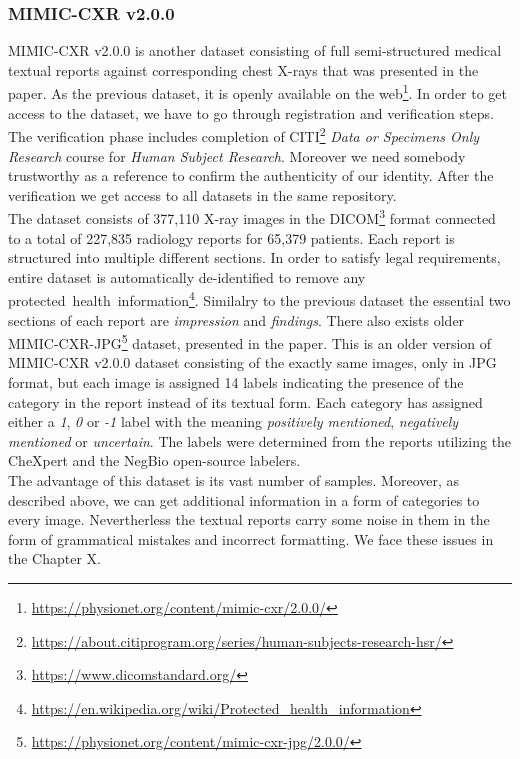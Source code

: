 \subsubsection{MIMIC-CXR v2.0.0}
MIMIC-CXR v2.0.0 is another dataset consisting of full semi-structured medical textual reports against corresponding chest X-rays that was presented in the \citet{cxr:johnson2019mimic} paper. As the previous dataset, it is openly available on the web\footnote[1]{\url{https://physionet.org/content/mimic-cxr/2.0.0/}}. In order to get access to the dataset, we have to go through registration and verification steps. The verification phase includes completion of CITI\footnote[1]{\url{https://about.citiprogram.org/series/human-subjects-research-hsr/}} \textit{Data or Specimens Only Research} course for \textit{Human Subject Research}. Moreover we need somebody trustworthy as a reference to confirm the authenticity of our identity. After the verification we get access to all datasets in the same repository.\\

The dataset consists of 377,110 X-ray images in the DICOM\footnote[1]{\url{https://www.dicomstandard.org/}} format connected to a total of 227,835 radiology reports for 65,379 patients. Each report is structured into multiple different sections. In order to satisfy legal requirements, entire dataset is automatically de-identified to remove any protected~health~information\footnote[1]{\url{https://en.wikipedia.org/wiki/Protected\_health\_information}}. Similalry to the previous dataset the essential two sections of each report are \textit{impression} and \textit{findings}. There also exists older MIMIC-CXR-JPG\footnote[1]{\url{https://physionet.org/content/mimic-cxr-jpg/2.0.0/}} dataset, presented in the \citet{cxr-jpg:johnson2019mimic} paper. This is an older version of MIMIC-CXR v2.0.0 dataset consisting of the exactly same images, only in JPG format, but each image is assigned 14 labels indicating the presence of the category in the report instead of its textual form. Each category has assigned either a \textit{1}, \textit{0} or \textit{-1} label with the meaning \textit{positively mentioned}, \textit{negatively mentioned} or \textit{uncertain}. The labels were determined from the reports utilizing the CheXpert\citep{irvin2019chexpert} and the NegBio\citep{peng2018negbio} open-source labelers.\\

The advantage of this dataset is its vast number of samples. Moreover, as described above, we can get additional information in a form of categories to every image. Nevertherless the textual reports carry some noise in them in the form of grammatical mistakes and incorrect formatting. We face these issues in the Chapter X. 

